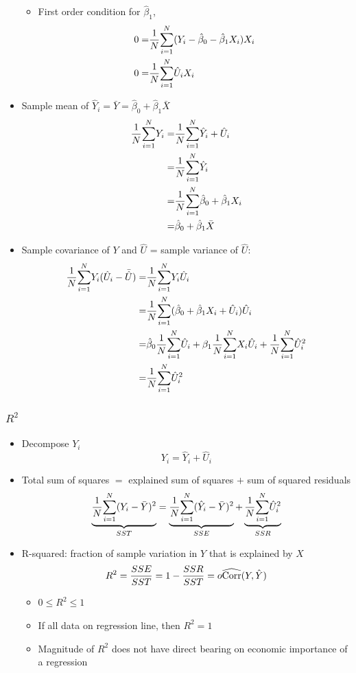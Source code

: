 \begin{frame}[allowframebreaks]
\begin{itemize}
\begin{itemize}
    \item First order condition for $\hat{\beta}_1$,
      \begin{align*}
        0 = &\frac{1}{N} \underset{i=1}{\overset{N}{\sum}} (Y_i - \hat{\beta}_0 - \hat{\beta}_1
        X_i)X_i \\ 
        0 = & \frac{1}{N} \underset{i=1}{\overset{N}{\sum}} \hat{U}_i X_i
      \end{align*}
    \end{itemize}
  \item Sample mean of $\hat{Y}_i = \bar{Y} = \hat{\beta}_0 +
    \hat{\beta}_1 \bar{X}$ 
    \begin{align*}
      \frac{1}{N} \underset{i=1}{\overset{N}{\sum}} Y_i = & \frac{1}{N} \underset{i=1}{\overset{N}{\sum}} \hat{Y}_i + \hat{U}_i \\
      = & \frac{1}{N} \underset{i=1}{\overset{N}{\sum}} \hat{Y}_i \\
      = & \frac{1}{N} \underset{i=1}{\overset{N}{\sum}}  \hat{\beta}_0 + \hat{\beta}_1 X_i \\
      = & \hat{\beta}_0 + \hat{\beta}_1 \bar{X}
    \end{align*}
  \item Sample covariance of $Y$ and $\hat{U}$ = sample
    variance of $\hat{U}$:
    \begin{align*}
      \frac{1}{N} \underset{i=1}{\overset{N}{\sum}} Y_i (\hat{U}_i - \bar{\hat{U}}) = & \frac{1}{N} \underset{i=1}{\overset{N}{\sum}} Y_i
      \hat{U}_i \\
      = & \frac{1}{N} \underset{i=1}{\overset{N}{\sum}} (\hat{\beta}_0 + \hat{\beta}_1 X_i +
      \hat{U}_i)\hat{U}_i \\
      = & \hat{\beta}_0 \frac{1}{N} \underset{i=1}{\overset{N}{\sum}} \hat{U}_i + \beta_1 \frac{1}{N} \underset{i=1}{\overset{N}{\sum}} X_i
      \hat{U}_i + \frac{1}{N} \underset{i=1}{\overset{N}{\sum}} \hat{U}_i^2 \\
      = & \frac{1}{N} \underset{i=1}{\overset{N}{\sum}} \hat{U}_i^2 
    \end{align*}
\end{itemize}
\end{frame}

\begin{frame}[allowframebreaks]
  \frametitle{$R^2$}
  \begin{itemize}
  \item Decompose $Y_i$
    \[ Y_i = \hat{Y}_i + \hat{U}_i \]
  \item Total sum of squares $=$ explained sum of squares $+$ sum of
    squared residuals
    \[ \underbrace{\frac{1}{N} \underset{i=1}{\overset{N}{\sum}} (Y_i - \bar{Y})^2}_{SST} =
    \underbrace{\frac{1}{N} \underset{i=1}{\overset{N}{\sum}} (\hat{Y}_i - \bar{Y})^2}_{SSE} +
    \underbrace{\frac{1}{N} \underset{i=1}{\overset{N}{\sum}} \hat{U}_i^2}_{SSR} \]
  \item \alert{R-squared}: fraction of sample variation in $Y$ that is
    explained by $X$
    \[ R^2 = \frac{SSE}{SST} = 1 - \frac{SSR}{SST} =o
    \widehat{\mathrm{Corr}}(Y,\hat{Y}) \]
    \begin{itemize}
    \item $0 \leq R^2 \leq 1$
    \item If all data on regression line, then $R^2 = 1$
    \item Magnitude of $R^2$ does not have direct bearing on economic
      importance of a regression
    \end{itemize}
  \end{itemize}
\end{frame}

